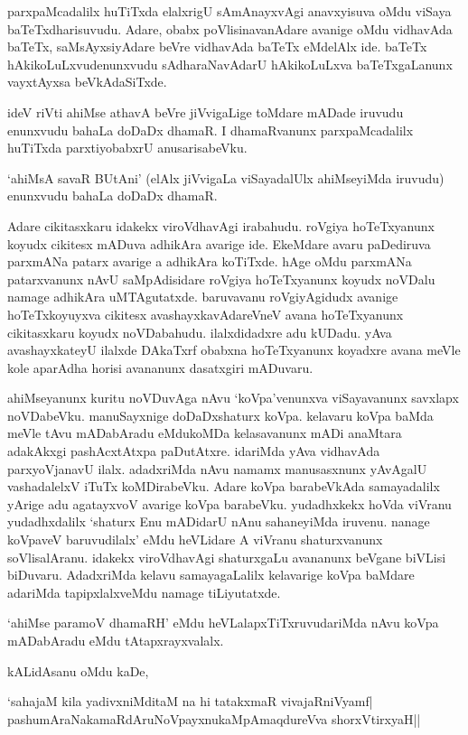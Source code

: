 parxpaMcadalilx huTiTxda elalxrigU sAmAnayxvAgi anavxyisuva oMdu viSaya baTeTxdharisuvudu. Adare, obabx poVlisinavanAdare avanige oMdu vidhavAda baTeTx, saMsAyxsiyAdare beVre vidhavAda baTeTx eMdelAlx ide. baTeTx hAkikoLuLxvudenunxvudu sAdharaNavAdarU hAkikoLuLxva baTeTxgaLanunx vayxtAyxsa beVkAdaSiTxde.

ideV riVti ahiMse athavA beVre jiVvigaLige toMdare mADade iruvudu enunxvudu bahaLa doDaDx dhamaR. I dhamaRvanunx parxpaMcadalilx huTiTxda parxtiyobabxrU anusarisabeVku.

`ahiMsA savaR BUtAni' (elAlx jiVvigaLa viSayadalUlx ahiMseyiMda iruvudu) enunxvudu bahaLa doDaDx dhamaR.

Adare cikitasxkaru idakekx viroVdhavAgi irabahudu. roVgiya hoTeTxyanunx koyudx cikitesx mADuva adhikAra avarige ide. EkeMdare avaru paDediruva parxmANa patarx avarige a adhikAra koTiTxde. hAge oMdu parxmANa patarxvanunx nAvU saMpAdisidare roVgiya hoTeTxyanunx koyudx noVDalu namage adhikAra uMTAgutatxde. baruvavanu roVgiyAgidudx avanige hoTeTxkoyuyxva cikitesx avashayxkavAdareVneV avana hoTeTxyanunx cikitasxkaru koyudx noVDabahudu. ilalxdidadxre adu kUDadu. yAva avashayxkateyU ilalxde DAkaTxrf obabxna hoTeTxyanunx koyadxre avana meVle kole aparAdha horisi avananunx dasatxgiri mADuvaru.

ahiMseyanunx kuritu noVDuvAga nAvu `koVpa'venunxva viSayavanunx savxlapx noVDabeVku. manuSayxnige doDaDxshaturx koVpa. kelavaru koVpa baMda meVle tAvu mADabAradu eMdukoMDa kelasavanunx mADi anaMtara adakAkxgi pashAcxtAtxpa paDutAtxre. idariMda yAva vidhavAda parxyoVjanavU ilalx. adadxriMda nAvu namamx manusasxnunx yAvAgalU vashadalelxV iTuTx koMDirabeVku. Adare koVpa barabeVkAda samayadalilx yArige adu agatayxvoV avarige koVpa barabeVku. yudadhxkekx hoVda viVranu yudadhxdalilx `shaturx Enu mADidarU nAnu sahaneyiMda iruvenu. nanage koVpaveV baruvudilalx' eMdu heVLidare A viVranu shaturxvanunx soVlisalAranu. idakekx viroVdhavAgi shaturxgaLu avananunx beVgane biVLisi biDuvaru. AdadxriMda kelavu samayagaLalilx kelavarige koVpa baMdare adariMda tapipxlalxveMdu namage tiLiyutatxde.

`ahiMse paramoV dhamaRH' eMdu heVLalapxTiTxruvudariMda nAvu koVpa mADabAradu eMdu tAtapxrayxvalalx. 

kALidAsanu oMdu kaDe,

\begin{shloka}
`sahajaM kila yadivxniMditaM na hi tatakxmaR vivajaRniVyamf|\\
pashumAraNakamaRdAruNoV\s payxnukaMpAmaqdureVva shorxVtirxyaH|| 
\end{shloka}


